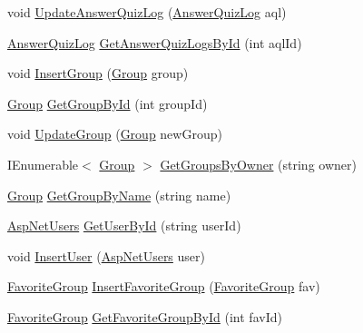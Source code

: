 \begin{DoxyCompactItemize}
\item 
void \hyperlink{interface_website_1_1_models_1_1_i_d_a_l_e_f_a153f491311053ba79a5d8b4882fd5e5a}{Update\+Answer\+Quiz\+Log} (\hyperlink{class_website_1_1_models_1_1_answer_quiz_log}{Answer\+Quiz\+Log} aql)
\item 
\hyperlink{class_website_1_1_models_1_1_answer_quiz_log}{Answer\+Quiz\+Log} \hyperlink{interface_website_1_1_models_1_1_i_d_a_l_e_f_aac37dd2a9fdda4e271394ebee8d04e2f}{Get\+Answer\+Quiz\+Logs\+By\+Id} (int aql\+Id)
\item 
void \hyperlink{interface_website_1_1_models_1_1_i_d_a_l_e_f_ad469df2127a95742ba8c51bae3fff0b8}{Insert\+Group} (\hyperlink{class_website_1_1_models_1_1_group}{Group} group)
\item 
\hyperlink{class_website_1_1_models_1_1_group}{Group} \hyperlink{interface_website_1_1_models_1_1_i_d_a_l_e_f_a759834d46580c9332d65243b9481c307}{Get\+Group\+By\+Id} (int group\+Id)
\item 
void \hyperlink{interface_website_1_1_models_1_1_i_d_a_l_e_f_a57bef3497adaa7d28d6e952dc7b4e5df}{Update\+Group} (\hyperlink{class_website_1_1_models_1_1_group}{Group} new\+Group)
\item 
I\+Enumerable$<$ \hyperlink{class_website_1_1_models_1_1_group}{Group} $>$ \hyperlink{interface_website_1_1_models_1_1_i_d_a_l_e_f_a1cf901ce5b82adaee0e1bee1b9a0d8e0}{Get\+Groups\+By\+Owner} (string owner)
\item 
\hyperlink{class_website_1_1_models_1_1_group}{Group} \hyperlink{interface_website_1_1_models_1_1_i_d_a_l_e_f_a67a2b816a0e530ea4cf47ccf11381559}{Get\+Group\+By\+Name} (string name)
\item 
\hyperlink{class_website_1_1_asp_net_users}{Asp\+Net\+Users} \hyperlink{interface_website_1_1_models_1_1_i_d_a_l_e_f_a1bace3f5f1e8b0989f22fea5e827a6e1}{Get\+User\+By\+Id} (string user\+Id)
\item 
void \hyperlink{interface_website_1_1_models_1_1_i_d_a_l_e_f_ac2713e7178fb12a9a8ff026c9c44fe34}{Insert\+User} (\hyperlink{class_website_1_1_asp_net_users}{Asp\+Net\+Users} user)
\item 
\hyperlink{class_website_1_1_models_1_1_favorite_group}{Favorite\+Group} \hyperlink{interface_website_1_1_models_1_1_i_d_a_l_e_f_a9d50d376a329a1fd46ab1677b402e858}{Insert\+Favorite\+Group} (\hyperlink{class_website_1_1_models_1_1_favorite_group}{Favorite\+Group} fav)
\item 
\hyperlink{class_website_1_1_models_1_1_favorite_group}{Favorite\+Group} \hyperlink{interface_website_1_1_models_1_1_i_d_a_l_e_f_a69ead9752cd8475ef78b9654091d86d8}{Get\+Favorite\+Group\+By\+Id} (int fav\+Id)

\end{DoxyCompactItemize}
